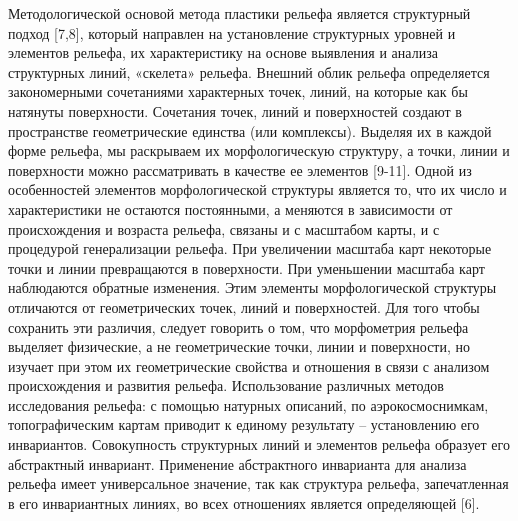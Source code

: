 \documentclass[runningheads]{AIIT}
\begin{document}
Методологической основой метода пластики рельефа является структурный подход [7,8], который направлен на установление структурных уровней и элементов рельефа, их характеристику на основе выявления и анализа структурных линий, «скелета» рельефа. Внешний облик рельефа определяется закономерными сочетаниями характерных точек, линий, на которые как бы натянуты поверхности. Сочетания точек, линий и поверхностей создают в пространстве геометрические единства (или комплексы). Выделяя их в каждой форме рельефа, мы раскрываем их морфологическую структуру, а точки, линии и поверхности можно рассматривать в качестве ее элементов [9-11].
Одной из особенностей элементов морфологической структуры является то, что их число и характеристики не остаются постоянными, а меняются в зависимости от происхождения и возраста рельефа, связаны и с масштабом карты, и с процедурой генерализации рельефа. При увеличении масштаба карт некоторые точки и линии превращаются в поверхности. При уменьшении масштаба карт наблюдаются обратные изменения. Этим элементы морфологической структуры отличаются от геометрических точек, линий и поверхностей. Для того чтобы сохранить эти различия, следует говорить о том, что морфометрия рельефа выделяет физические, а не геометрические точки, линии и поверхности, но изучает при этом их геометрические свойства и отношения в связи с анализом происхождения и развития рельефа.
Использование различных методов исследования рельефа: с помощью натурных описаний, по аэрокосмоснимкам, топографическим картам приводит к единому результату – установлению его инвариантов. Совокупность структурных линий и элементов рельефа образует его абстрактный инвариант. Применение абстрактного инварианта для анализа рельефа имеет универсальное значение, так как структура рельефа, запечатленная в его инвариантных линиях, во всех отношениях является определяющей [6].
\end{document}
